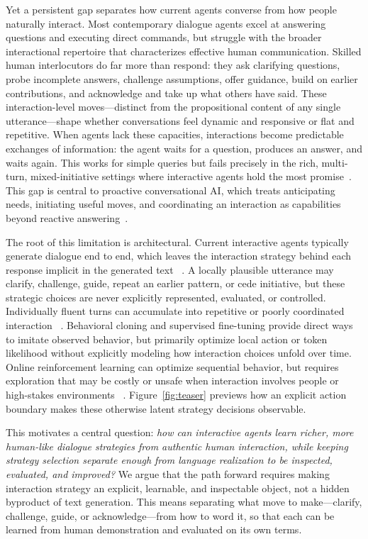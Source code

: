 \documentclass[manuscript,review,anonymous]{acmart}
\begin{document}
Yet a persistent gap separates how current agents converse from how people
naturally interact. Most contemporary dialogue agents excel at answering
questions and executing direct commands, but struggle with the broader
interactional repertoire that characterizes effective human communication.
Skilled human interlocutors do far more than respond: they ask clarifying
questions, probe incomplete answers, challenge assumptions, offer guidance,
build on earlier contributions, and acknowledge and take up what others have
said. These interaction-level moves---distinct from the propositional content
of any single utterance---shape whether conversations feel dynamic and
responsive or flat and repetitive. When agents lack these capacities,
interactions become predictable exchanges of information: the agent waits for a
question, produces an answer, and waits again. This works for simple queries
but fails precisely in the rich, multi-turn, mixed-initiative settings where
interactive agents hold the most promise~\citep{horvitz1999mixed}. This gap is central to proactive
conversational AI, which treats anticipating needs, initiating useful moves,
and coordinating an interaction as capabilities beyond reactive
answering~\citep{deng2025proactive}.

The root of this limitation is architectural. Current interactive agents
typically generate dialogue end to end, which leaves the interaction strategy
behind each response implicit in the generated text
~\citep{achiam2023gpt,kasneci2023chatgpt,park2023generative,xi2025rise}. A
locally plausible utterance may clarify, challenge, guide, repeat an earlier
pattern, or cede initiative, but these strategic choices are never explicitly
represented, evaluated, or controlled. Individually fluent turns can
accumulate into repetitive or poorly coordinated interaction
~\citep{li2016diversity,zhao2017learning}. Behavioral cloning and supervised
fine-tuning provide direct ways to imitate observed behavior, but primarily
optimize local action or token likelihood without explicitly modeling how
interaction choices unfold over time. Online reinforcement learning can
optimize sequential behavior, but requires exploration that may be costly or
unsafe when interaction involves people or high-stakes environments
~\citep{li2016deep,ouyang2022training,schulman2017proximal}.
Figure~\ref{fig:teaser} previews how an explicit action boundary makes these
otherwise latent strategy decisions observable.

This motivates a central question: \emph{how can interactive agents learn
richer, more human-like dialogue strategies from authentic human interaction,
while keeping strategy selection separate enough from language realization to
be inspected, evaluated, and improved?} We argue that the path forward requires
making interaction strategy an explicit, learnable, and inspectable object, not
a hidden byproduct of text generation. This means separating what move to
make---clarify, challenge, guide, or acknowledge---from how to word it, so that
each can be learned from human demonstration and evaluated on its own terms.
\end{document}
